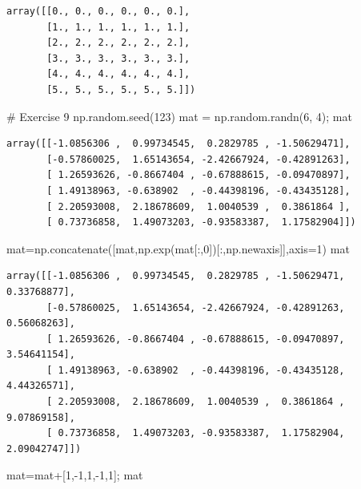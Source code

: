 \documentclass[
  letterpaper,
  DIV=11,
  numbers=noendperiod]{scrreprt}
\newenvironment{Shaded}{\begin{snugshade}}{\end{snugshade}}
\newcommand{\CommentTok}[1]{\textcolor[rgb]{0.37,0.37,0.37}{#1}}
\newcommand{\DecValTok}[1]{\textcolor[rgb]{0.68,0.00,0.00}{#1}}
\newcommand{\NormalTok}[1]{\textcolor[rgb]{0.00,0.23,0.31}{#1}}
\newcommand{\OperatorTok}[1]{\textcolor[rgb]{0.37,0.37,0.37}{#1}}
\begin{document}
\begin{verbatim}
array([[0., 0., 0., 0., 0., 0.],
       [1., 1., 1., 1., 1., 1.],
       [2., 2., 2., 2., 2., 2.],
       [3., 3., 3., 3., 3., 3.],
       [4., 4., 4., 4., 4., 4.],
       [5., 5., 5., 5., 5., 5.]])
\end{verbatim}

\begin{Shaded}
\begin{Highlighting}[]
\CommentTok{\# Exercise 9}
\NormalTok{np.random.seed(}\DecValTok{123}\NormalTok{)}
\NormalTok{mat }\OperatorTok{=}\NormalTok{ np.random.randn(}\DecValTok{6}\NormalTok{, }\DecValTok{4}\NormalTok{)}\OperatorTok{;}\NormalTok{ mat}
\end{Highlighting}
\end{Shaded}

\begin{verbatim}
array([[-1.0856306 ,  0.99734545,  0.2829785 , -1.50629471],
       [-0.57860025,  1.65143654, -2.42667924, -0.42891263],
       [ 1.26593626, -0.8667404 , -0.67888615, -0.09470897],
       [ 1.49138963, -0.638902  , -0.44398196, -0.43435128],
       [ 2.20593008,  2.18678609,  1.0040539 ,  0.3861864 ],
       [ 0.73736858,  1.49073203, -0.93583387,  1.17582904]])
\end{verbatim}

\begin{Shaded}
\begin{Highlighting}[]
\NormalTok{mat}\OperatorTok{=}\NormalTok{np.concatenate([mat,np.exp(mat[:,}\DecValTok{0}\NormalTok{])[:,np.newaxis]],axis}\OperatorTok{=}\DecValTok{1}\NormalTok{)}
\NormalTok{mat}
\end{Highlighting}
\end{Shaded}

\begin{verbatim}
array([[-1.0856306 ,  0.99734545,  0.2829785 , -1.50629471,  0.33768877],
       [-0.57860025,  1.65143654, -2.42667924, -0.42891263,  0.56068263],
       [ 1.26593626, -0.8667404 , -0.67888615, -0.09470897,  3.54641154],
       [ 1.49138963, -0.638902  , -0.44398196, -0.43435128,  4.44326571],
       [ 2.20593008,  2.18678609,  1.0040539 ,  0.3861864 ,  9.07869158],
       [ 0.73736858,  1.49073203, -0.93583387,  1.17582904,  2.09042747]])
\end{verbatim}

\begin{Shaded}
\begin{Highlighting}[]
\NormalTok{mat}\OperatorTok{=}\NormalTok{mat}\OperatorTok{+}\NormalTok{[}\DecValTok{1}\NormalTok{,}\OperatorTok{{-}}\DecValTok{1}\NormalTok{,}\DecValTok{1}\NormalTok{,}\OperatorTok{{-}}\DecValTok{1}\NormalTok{,}\DecValTok{1}\NormalTok{]}\OperatorTok{;}\NormalTok{ mat}
\end{Highlighting}
\end{Shaded}
\end{document}
